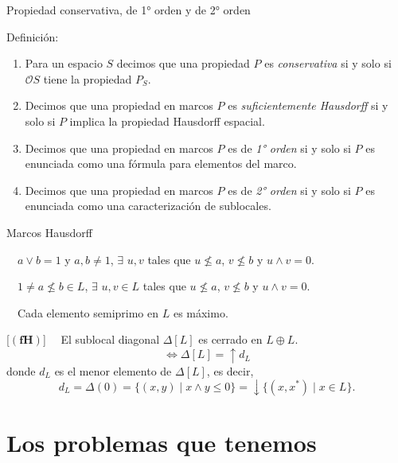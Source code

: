 \documentclass[compress,12pt]{beamer}
\begin{document}
\begin{frame}{Propiedad conservativa, de 1° orden y de 2° orden}

	\begin{block}{Definición:}
		\begin{enumerate}
			\item Para un espacio $S$ decimos que una propiedad $P$ es \emph{conservativa} si y solo si $\mathcal{O}S$ tiene la propiedad $P_S$.
	
			\item<2-> Decimos que una propiedad en marcos $P$ es \emph{suficientemente Hausdorff} si y solo si $P$ implica la propiedad Hausdorff espacial.
			
			\item<3-> Decimos que una propiedad en marcos $P$ es de \emph{1° orden} si y solo si $P$ es enunciada como una fórmula para elementos del marco.
	
			\item<4-> Decimos que una propiedad en marcos $P$ es de \emph{2° orden} si y solo si $P$ es enunciada como una caracterización de sublocales.
		\end{enumerate}
	\end{block}
	
	\end{frame}

\begin{frame}{Marcos Hausdorff}
	\begin{description}
        \item[$(\mathbf{dH})$] $\quad a\vee b=1$ y $a, b\neq 1$, $\exists$ $u, v$ tales que $u\nleq a$, $v\nleq b$ y $u\wedge v=0$. 
        \item<2->[$(\mathbf{H})$] $\quad 1\neq a\nleq b\in L$, $\exists$ $u, v\in L$ tales que $u\nleq a$, $v\nleq b$ y $u\wedge v=0$. 
        \item<3->[$(\mathbf{Hp})$] $\quad$Cada elemento semiprimo en $L$ es máximo.
        \item<4->{[$(\mathbf{fH})$] $\quad$El sublocal diagonal $\Delta[L]$ es cerrado en $L\oplus L$.
        \[
        \Leftrightarrow \Delta[L]=\uparrow d_L
        \]
        donde $d_L$ es el menor elemento de $\Delta[L]$, es decir,
\[
d_L=\Delta(0)=\{(x, y)\mid x\wedge y\leq 0\}=\downarrow\{(x, x^*)\mid x\in L\}.
\]}
    \end{description}
\end{frame}

\section{Los problemas que tenemos}
\end{document}
